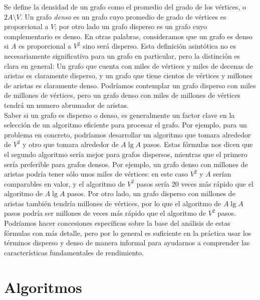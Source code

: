 \documentclass[a4paper,12pt]{article}
\begin{document}
Se define la densidad de un grafo como el promedio del grado de los vértices, o $2 A \setminus V$. Un grafo \emph{denso} es un grafo cuyo promedio de grado de vértices es proporcional a $V$; por otro lado un grafo disperso es un grafo cuyo complementario es denso. En otras palabras, consideramos que un grafo es denso si $A$ es proporcional a $V^2$ sino será disperso. Esta definición asintótica no es necesariamente significativa para un grafo en particular, pero la distinción es clara en general: Un grafo que cuenta con miles de vértices y miles de decenas de aristas es claramente disperso, y un grafo que tiene cientos de vértices y millones de aristas es claramente denso. Podríamos contemplar un grafo disperso con miles de millones de vértices, pero un grafo denso con miles de millones de vértices tendrá un numero abrumador de aristas. \\

Saber si un grafo es disperso o denso, es generalmente un factor clave en la selección de un algoritmo eficiente para procesar el grafo. Por ejemplo, para un problema en concreto, podríamos desarrollar un algoritmo que tomara alrededor de $V^2$ y otro que tomara alrededor de $A \lg A$ pasos. Estas fórmulas nos dicen que el segundo algoritmo sería mejor para grafos dispersos, mientras que el primero sería preferible para grafos densos. Por ejemplo, un grafo denso con millones de aristas podría tener sólo unos miles de vértices: en este caso $V^2$ y $A$ serían comparables en valor, y el algoritmo de $V^2$ pasos sería 20 veces más rápido que el algoritmo de $A \lg A$ pasos. Por otro lado, un grafo disperso con millones de aristas también tendría millones de vértices, por lo que el algoritmo de $A \lg A$ pasos podría ser millones de veces más rápido que el algoritmo de $V^2$ pasos. Podríamos hacer concesiones específicas sobre la base del análisis de estas fórmulas con más detalle, pero por lo general es suficiente en la práctica usar los términos disperso y denso de manera informal para ayudarnos a comprender las características fundamentales de rendimiento.\\

\section{Algoritmos}
\end{document}
